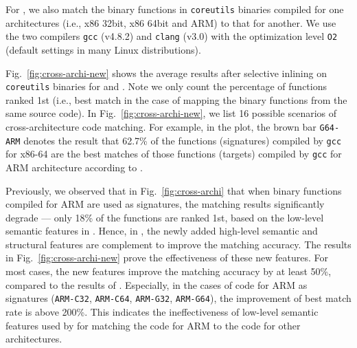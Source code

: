 For \toolNew, we also match the binary functions in \texttt{coreutils} binaries compiled for one architectures (i.e., x86 32bit, x86 64bit and ARM) to that for another. We use the two compilers \texttt{gcc} (v4.8.2) and \texttt{clang} (v3.0) with the optimization level \texttt{O2} (default settings in many Linux distributions). %

Fig.~\ref{fig:cross-archi-new} shows the average results after selective inlining on \texttt{coreutils} binaries for \tool and \toolNew.
Note we only count the percentage of functions ranked 1st (i.e., best match in the case of mapping the binary functions from the same source code).
In Fig.~\ref{fig:cross-archi-new}, we list 16 possible scenarios of cross-architecture code matching.
For example, in the plot, the brown bar \texttt{G64-ARM}  denotes the result that 62.7\% of the functions (signatures) compiled by \texttt{gcc}  for  x86-64 are the best matches of those functions (targets) compiled by \texttt{gcc} for ARM architecture according to \toolNew.

Previously, we observed that in Fig.~\ref{fig:cross-archi} that when  binary functions compiled for ARM are used as signatures, the  matching results significantly degrade --- only 18\% of the functions are ranked 1st, based on the low-level semantic features in \tool.  Hence, in \toolNew, the newly added high-level semantic and structural features are complement to improve the matching accuracy. The results in Fig.~\ref{fig:cross-archi-new} prove the effectiveness of these new features. For most cases, the new features improve the matching accuracy by at least 50\%, compared to the results of \tool. Especially, in the cases of code for ARM as signatures (\texttt{ARM-C32}, \texttt{ARM-C64}, \texttt{ARM-G32}, \texttt{ARM-G64}), the improvement of best match rate is above 200\%. This indicates the ineffectiveness of low-level semantic features used by \tool for matching the code for ARM to the code for other architectures.


